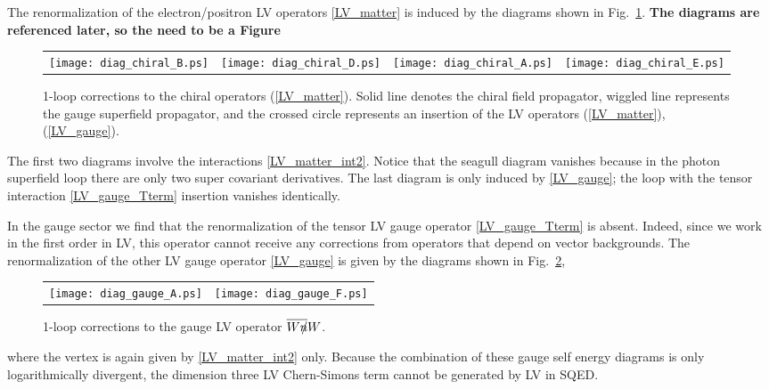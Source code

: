 \documentclass[12pt]{revtex4}
\newcommand{\slashed}[1]{\hbox{{$#1$}\llap{$/$}}}
\begin{document}
The renormalization of the electron/positron LV operators
\eqref{LV_matter} is induced by the diagrams shown in 
Fig.~\ref{diag_LV_chiral}. 
{\bf The diagrams are referenced later, so the need to be a Figure}
\begin{figure}[h]
\caption{\label{diag_LV_chiral}
        1-loop corrections to the
        chiral operators (\ref{LV_matter}). 
        Solid line denotes the chiral field propagator, wiggled line
        represents the gauge superfield propagator, and the crossed circle
        represents an insertion of the LV operators
        (\ref{LV_matter}), (\ref{LV_gauge}).
}
\begin{center}
\begin{tabular}{cccc}
\texttt{[image: diag\_chiral\_B.ps]}
&
\texttt{[image: diag\_chiral\_D.ps]}
&
\texttt{[image: diag\_chiral\_A.ps]}
&
\texttt{[image: diag\_chiral\_E.ps]}
\end{tabular}
\end{center}
\end{figure}

The first two diagrams involve the interactions
\eqref{LV_matter_int2}. Notice that the seagull diagram vanishes
because in the photon superfield loop there are only two super
covariant derivatives. 
The last diagram is only induced by
\eqref{LV_gauge}; the loop with the tensor interaction
\eqref{LV_gauge_Tterm} insertion vanishes identically. 


In the gauge sector we find that the renormalization of the tensor LV
gauge operator \eqref{LV_gauge_Tterm} is absent. 
Indeed, since we work in the first order in
LV, this operator cannot receive any corrections from operators that
depend on vector backgrounds. The renormalization of the other LV
gauge operator \eqref{LV_gauge} is given by the diagrams shown in
Fig.~\ref{diag_LV_gauge},
\begin{figure}[h]
\caption{\label{diag_LV_gauge}
        1-loop corrections to the gauge LV operator 
        $ \overline{W\slashed{n}} W $.
}
\begin{center}
\begin{tabular}{cc}
\texttt{[image: diag\_gauge\_A.ps]}
&
\texttt{[image: diag\_gauge\_F.ps]}
\end{tabular}
\end{center}
\end{figure}
where the vertex is again given by \eqref{LV_matter_int2}
only. Because the combination of these gauge self energy diagrams is
only logarithmically divergent, the dimension three LV Chern-Simons
term cannot be generated by LV in SQED.   
\end{document}
